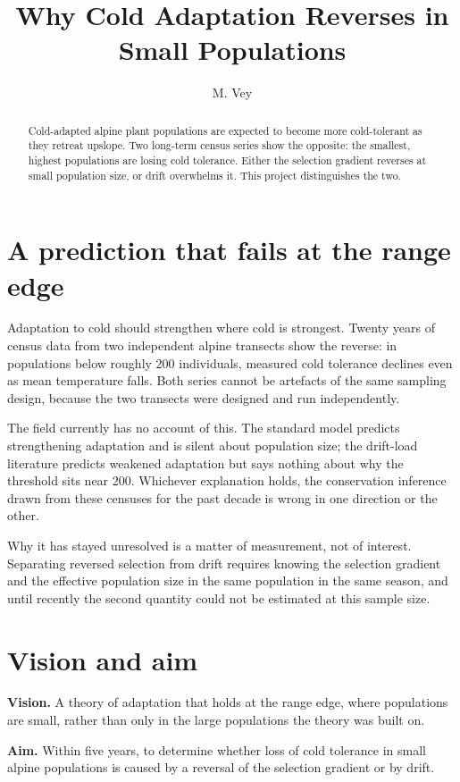\documentclass[11pt,a4paper]{article}
\title{Why Cold Adaptation Reverses in Small Populations}
\author[Vey]{M. Vey}
\begin{document}
\maketitle

\begin{abstract}
Cold-adapted alpine plant populations are expected to become more cold-tolerant as
they retreat upslope. Two long-term census series show the opposite: the smallest,
highest populations are losing cold tolerance. Either the selection gradient reverses
at small population size, or drift overwhelms it. This project distinguishes the two.
\end{abstract}

\startsectiona

\section{A prediction that fails at the range edge}
Adaptation to cold should strengthen where cold is strongest. Twenty years of census
data from two independent alpine transects show the reverse: in populations below
roughly 200 individuals, measured cold tolerance declines even as mean temperature
falls. Both series cannot be artefacts of the same sampling design, because the two
transects were designed and run independently.

The field currently has no account of this. The standard model predicts strengthening
adaptation and is silent about population size; the drift-load literature predicts
weakened adaptation but says nothing about why the threshold sits near 200. Whichever
explanation holds, the conservation inference drawn from these censuses for the past
decade is wrong in one direction or the other.

Why it has stayed unresolved is a matter of measurement, not of interest. Separating
reversed selection from drift requires knowing the selection gradient and the effective
population size in the same population in the same season, and until recently the
second quantity could not be estimated at this sample size.

\section{Vision and aim}
\textbf{Vision.} A theory of adaptation that holds at the range edge, where populations
are small, rather than only in the large populations the theory was built on.

\textbf{Aim.} Within five years, to determine whether loss of cold tolerance in small
alpine populations is caused by a reversal of the selection gradient or by drift.
\end{document}
